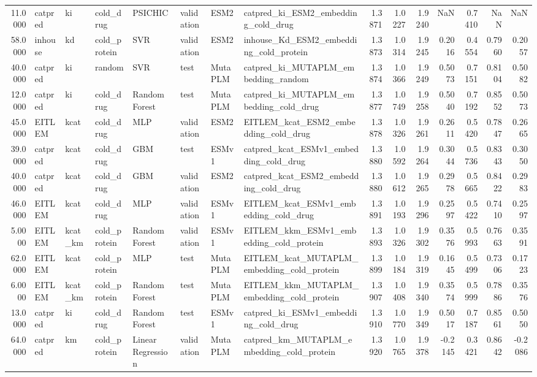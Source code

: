 \begin{tabular}{rlllllllrrrrrrr}
11.0000 & catpred & ki & cold_drug & PSICHIC & validation & ESM2 & catpred_ki_ESM2_embedding_cold_drug & 1.3871 & 1.0227 & 1.9240 & NaN & 0.7410 & NaN & NaN \\
58.0000 & inhouse & kd & cold_protein & SVR & validation & ESM2 & inhouse_Kd_ESM2_embedding_cold_protein & 1.3873 & 1.0314 & 1.9245 & 0.2016 & 0.4554 & 0.7960 & 0.2057 \\
40.0000 & catpred & ki & random & SVR & test & MutaPLM & catpred_ki_MUTAPLM_embedding_random & 1.3874 & 1.0366 & 1.9249 & 0.5073 & 0.7151 & 0.8104 & 0.5082 \\
12.0000 & catpred & ki & cold_drug & Random Forest & test & MutaPLM & catpred_ki_MUTAPLM_embedding_cold_drug & 1.3877 & 1.0749 & 1.9258 & 0.5040 & 0.7192 & 0.8552 & 0.5073 \\
45.0000 & EITLEM & kcat & cold_drug & MLP & validation & ESM2 & EITLEM_kcat_ESM2_embedding_cold_drug & 1.3878 & 1.0326 & 1.9261 & 0.2611 & 0.5420 & 0.7847 & 0.2665 \\
39.0000 & catpred & kcat & cold_drug & GBM & test & ESMv1 & catpred_kcat_ESMv1_embedding_cold_drug & 1.3880 & 1.0592 & 1.9264 & 0.3044 & 0.5736 & 0.8343 & 0.3050 \\
40.0000 & catpred & kcat & cold_drug & GBM & validation & ESM2 & catpred_kcat_ESM2_embedding_cold_drug & 1.3880 & 1.0612 & 1.9265 & 0.2978 & 0.5665 & 0.8422 & 0.2983 \\
46.0000 & EITLEM & kcat & cold_drug & MLP & validation & ESMv1 & EITLEM_kcat_ESMv1_embedding_cold_drug & 1.3891 & 1.0193 & 1.9296 & 0.2597 & 0.5422 & 0.7410 & 0.2597 \\
5.0000 & EITLEM & kcat_km & cold_protein & Random Forest & validation & ESMv1 & EITLEM_kkm_ESMv1_embedding_cold_protein & 1.3893 & 1.0326 & 1.9302 & 0.3576 & 0.5993 & 0.7663 & 0.3591 \\
62.0000 & EITLEM & kcat & cold_protein & MLP & test & MutaPLM & EITLEM_kcat_MUTAPLM_embedding_cold_protein & 1.3899 & 1.0184 & 1.9319 & 0.1645 & 0.5499 & 0.7306 & 0.1723 \\
6.0000 & EITLEM & kcat_km & cold_protein & Random Forest & test & MutaPLM & EITLEM_kkm_MUTAPLM_embedding_cold_protein & 1.3907 & 1.0408 & 1.9340 & 0.3574 & 0.5999 & 0.7886 & 0.3576 \\
13.0000 & catpred & ki & cold_drug & Random Forest & test & ESMv1 & catpred_ki_ESMv1_embedding_cold_drug & 1.3910 & 1.0770 & 1.9349 & 0.5017 & 0.7187 & 0.8561 & 0.5050 \\
64.0000 & catpred & km & cold_protein & Linear Regression & validation & MutaPLM & catpred_km_MUTAPLM_embedding_cold_protein & 1.3920 & 1.0765 & 1.9378 & -0.2145 & 0.3421 & 0.8642 & -0.2086 \\

\end{tabular}
